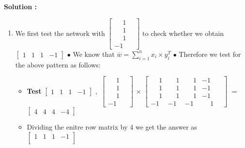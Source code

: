 \documentclass[12pt]{article}
\begin{document}
\textbf{Solution :}
\BlankLine
\begin{enumerate}[label=\textbf{\alph* .}]
	
	\item We first test the network with $\begin{bmatrix}
		\phantom{-}1\quad  \\
		\phantom{-}1\quad \\
		\phantom{-}1\quad  \\
		-1\quad
	\end{bmatrix}$ to check whether we obtain 	$\begin{bmatrix}
		1 & 1 & 1 & -1
	\end{bmatrix}$
	\BlankLine
	$\bullet$ We know that $\overline{w} = \displaystyle \sum_{i = 1 }^{n} x_i \times y_{i}^{T}$
	\BlankLine
	$\bullet$ Therefore we test for the above pattern as follows:
	\BlankLine
	\BlankLine
	
	\begin{itemize}[label=$\rightarrow$]
		
		\item \textbf{Test} $\begin{bmatrix}
			1 & 1 & 1 & -1
		\end{bmatrix}$ $,$ \quad\qquad $\begin{bmatrix}
			\phantom{-}1\quad  \\
			\phantom{-}1\quad \\
			\phantom{-}1\quad  \\
			-1\quad
		\end{bmatrix}$
		$\times$
		$\begin{bmatrix}
			\phantom{-}1 & 	\phantom{-}1 & 	\phantom{-}1 & -1 \quad\\
			\phantom{-}1 & 	\phantom{-}1 &	\phantom{-} 1 & -1 \quad \\
			\phantom{-}	1 & \phantom{-}1 &	\phantom{-} 1 & -1 \quad\\
			-1 & -1 & -1 & 	\phantom{-}1 \quad
		\end{bmatrix}$ $=$ $\begin{bmatrix}
			4 & 4 & 4 & -4
		\end{bmatrix}$ 
		
		\item Dividing the enitre row matrix by 4 we get the answer as $\begin{bmatrix}
			1 & 1 & 1 & -1\\
		\end{bmatrix}$ 
	\end{itemize}
	

\end{enumerate}
\end{document}
